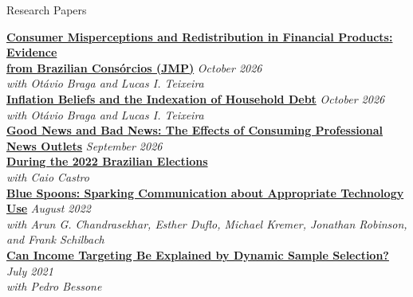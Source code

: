 \documentclass{resume} %
\begin{document}
\begin{rSection}{Research Papers}

{\bf \href{https://joaofpugliese.github.io/assets/pdf/jmp.pdf}{Consumer Misperceptions and Redistribution in Financial Products: Evidence \\ from Brazilian Consórcios (JMP)}} \hfill {\em October 2026} \\
{\it with Otávio Braga and Lucas I. Teixeira} \\

{\bf \href{https://otaviolmbraga.github.io/assets/jmp.pdf}{Inflation Beliefs and the Indexation of Household Debt}} \hfill {\em October 2026} \\
{\it with Otávio Braga and Lucas I. Teixeira} \\

{\bf \href{https://joaofpugliese.github.io/assets/pdf/CP_news_2026.pdf}{Good News and Bad News: The Effects of Consuming Professional News Outlets}} \hfill {\em September 2026} \\
{\bf \href{https://joaofpugliese.github.io/assets/pdf/CP_news_2026.pdf}{During the 2022 Brazilian Elections}} \\
{\it with Caio Castro} \\

{\bf \href{https://joaofpugliese.github.io/assets/pdf/CDKPRS.pdf}{Blue Spoons: Sparking Communication about Appropriate Technology Use}} \hfill {\em August 2022} \\
{\it with Arun G. Chandrasekhar, Esther Duflo, Michael Kremer, Jonathan Robinson, and Frank Schilbach} \\


{\bf \href{https://joaofpugliese.github.io/assets/pdf/BP.pdf}{Can Income Targeting Be Explained by Dynamic Sample Selection?}} \hfill {\em July 2021} \\
{\it with Pedro Bessone} \\

\end{rSection}

\newpage

\end{document}
